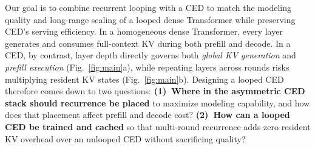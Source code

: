 Our goal is to combine recurrent looping with a CED to match the modeling quality and long-range scaling of a looped dense Transformer while preserving CED's serving efficiency. In a homogeneous dense Transformer, every layer generates and consumes full-context KV during both prefill and decode. In a CED, by contrast, layer depth directly governs both \emph{global KV generation} and \emph{prefill execution} (Fig.~\ref{fig:main}a), while repeating layers across rounds risks multiplying resident KV states (Fig.~\ref{fig:main}b). Designing a looped CED therefore comes down to two questions: \textbf{(1)~Where in the asymmetric CED stack should recurrence be placed} to maximize modeling capability, and how does that placement affect prefill and decode cost? \textbf{(2)~How can a looped CED be trained and cached} so that multi-round recurrence adds zero resident KV overhead over an unlooped CED without sacrificing quality?

